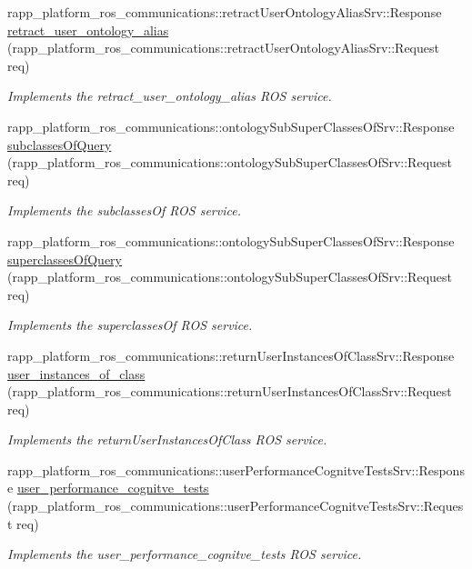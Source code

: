 \begin{DoxyCompactItemize}
rapp\-\_\-platform\-\_\-ros\-\_\-communications\-::retract\-User\-Ontology\-Alias\-Srv\-::\-Response \hyperlink{classKnowrobWrapper_a05ff27a5905ad1a44feb97b304a61e67}{retract\-\_\-user\-\_\-ontology\-\_\-alias} (rapp\-\_\-platform\-\_\-ros\-\_\-communications\-::retract\-User\-Ontology\-Alias\-Srv\-::\-Request req)
\begin{DoxyCompactList}\small\item\em Implements the retract\-\_\-user\-\_\-ontology\-\_\-alias R\-O\-S service. \end{DoxyCompactList}\item 
rapp\-\_\-platform\-\_\-ros\-\_\-communications\-::ontology\-Sub\-Super\-Classes\-Of\-Srv\-::\-Response \hyperlink{classKnowrobWrapper_a6e2ee6a631a705466a490f37ecf8afd5}{subclasses\-Of\-Query} (rapp\-\_\-platform\-\_\-ros\-\_\-communications\-::ontology\-Sub\-Super\-Classes\-Of\-Srv\-::\-Request req)
\begin{DoxyCompactList}\small\item\em Implements the subclasses\-Of R\-O\-S service. \end{DoxyCompactList}\item 
rapp\-\_\-platform\-\_\-ros\-\_\-communications\-::ontology\-Sub\-Super\-Classes\-Of\-Srv\-::\-Response \hyperlink{classKnowrobWrapper_a5347e77b2c2bf866c91b883f7eb19e42}{superclasses\-Of\-Query} (rapp\-\_\-platform\-\_\-ros\-\_\-communications\-::ontology\-Sub\-Super\-Classes\-Of\-Srv\-::\-Request req)
\begin{DoxyCompactList}\small\item\em Implements the superclasses\-Of R\-O\-S service. \end{DoxyCompactList}\item 
rapp\-\_\-platform\-\_\-ros\-\_\-communications\-::return\-User\-Instances\-Of\-Class\-Srv\-::\-Response \hyperlink{classKnowrobWrapper_a458f965a337460f5822c71bab7a9180d}{user\-\_\-instances\-\_\-of\-\_\-class} (rapp\-\_\-platform\-\_\-ros\-\_\-communications\-::return\-User\-Instances\-Of\-Class\-Srv\-::\-Request req)
\begin{DoxyCompactList}\small\item\em Implements the return\-User\-Instances\-Of\-Class R\-O\-S service. \end{DoxyCompactList}\item 
rapp\-\_\-platform\-\_\-ros\-\_\-communications\-::user\-Performance\-Cognitve\-Tests\-Srv\-::\-Response \hyperlink{classKnowrobWrapper_aada77adb91efe2be3ddd2ade2e90154a}{user\-\_\-performance\-\_\-cognitve\-\_\-tests} (rapp\-\_\-platform\-\_\-ros\-\_\-communications\-::user\-Performance\-Cognitve\-Tests\-Srv\-::\-Request req)
\begin{DoxyCompactList}\small\item\em Implements the user\-\_\-performance\-\_\-cognitve\-\_\-tests R\-O\-S service. \end{DoxyCompactList}\end{DoxyCompactItemize}
